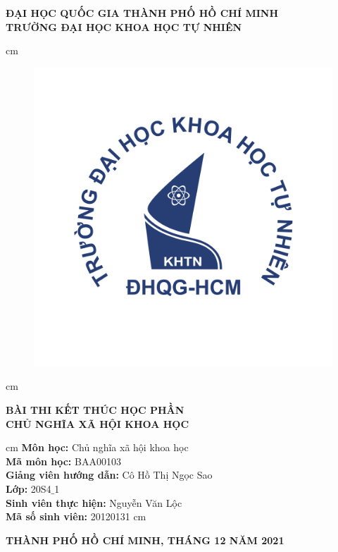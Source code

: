\begin{titlepage}
\begin{mybox}
\begin{center}
\fontsize{12}{12}\selectfont
\textbf{ĐẠI HỌC QUỐC GIA THÀNH PHỐ HỒ CHÍ MINH}\\
\textbf{TRƯỜNG ĐẠI HỌC KHOA HỌC TỰ NHIÊN}
\end{center}
 cm
\begin{figure}[H]
\begin{center}
\includegraphics[scale=0.25]{figures/logo_hcmus}
\end{center}
\end{figure}
 cm
\begin{center}
\fontsize{18}{14}\selectfont
\textbf{BÀI THI KẾT THÚC HỌC PHẦN}\\
\fontsize{22}{16}\selectfont
\textbf{CHỦ NGHĨA XÃ HỘI KHOA HỌC}\\
\fontsize{18}{12}\selectfont
\end{center}
 cm
\fontsize{14}{12}\selectfont
\textbf{Môn học:} Chủ nghĩa xã hội khoa học\\
\textbf{Mã môn học:} BAA00103\\
\textbf{Giảng viên hướng dẫn:} Cô Hồ Thị Ngọc Sao\\
\textbf{Lớp:} 20S4$\_$1\\
\textbf{Sinh viên thực hiện:} Nguyễn Văn Lộc\\
\textbf{Mã số sinh viên:} 20120131
 cm
\begin{center}
\textbf{THÀNH PHỐ HỒ CHÍ MINH, THÁNG 12 NĂM 2021}
\end{center}
\end{mybox}
\end{titlepage}